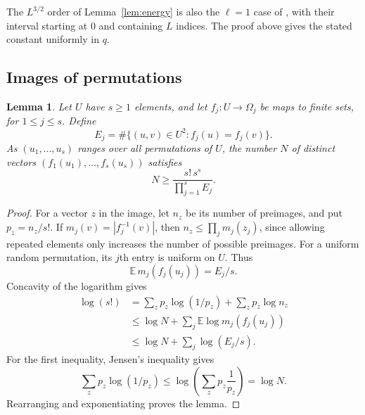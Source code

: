 \documentclass[11pt]{amsart}
\newtheorem{lemma}[theorem]{Lemma}
\theoremstyle{definition}
\theoremstyle{remark}
\begin{document}
The $L^{3/2}$ order of Lemma~\ref{lem:energy} is also the $\ell=1$
case of \cite[Theorem~1]{GaraevLucaShparlinski}, with their interval
starting at $0$ and containing $L$ indices. The proof above gives the
stated constant uniformly in $q$.

\subsection{Images of permutations}

\begin{lemma}\label{lem:permutationimage}
Let $U$ have $s\geq1$ elements, and let $f_j:U\to\Omega_j$ be maps to
finite sets, for $1\leq j\leq s$. Define
\[
E_j=\#\{(u,v)\in U^2:f_j(u)=f_j(v)\}.
\]
As $(u_1,\ldots,u_s)$ ranges over all permutations of $U$, the number
$N$ of distinct vectors $(f_1(u_1),\ldots,f_s(u_s))$ satisfies
\[
N\geq\frac{s!\,s^s}{\prod_{j=1}^s E_j}.
\]
\end{lemma}
\begin{proof}
For a vector $z$ in the image, let $n_z$ be its number of preimages, and put
$p_z=n_z/s!$. If $m_j(v)=|f_j^{-1}(v)|$, then
$n_z\leq\prod_jm_j(z_j)$, since allowing repeated elements only
increases the number of possible preimages.
For a uniform random permutation, its $j$th entry is uniform on $U$.
Thus
\[
\mathbb E\,m_j(f_j(u_j))=E_j/s.
\]
Concavity of the logarithm gives
\[
\begin{aligned}
\log(s!)
&=\sum_zp_z\log(1/p_z)+\sum_zp_z\log n_z\\
&\leq\log N+\sum_j\mathbb E\log m_j(f_j(u_j))\\
&\leq\log N+\sum_j\log(E_j/s).
\end{aligned}
\]
For the first inequality, Jensen's inequality gives
\[
\sum_zp_z\log(1/p_z)\leq\log\left(\sum_z p_z\frac1{p_z}\right)=\log N.
\]
Rearranging and exponentiating proves the lemma.
\end{proof}
\end{document}
